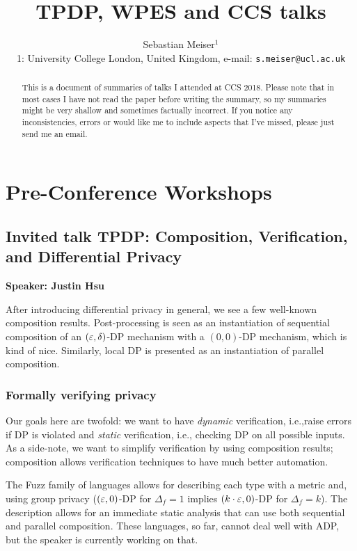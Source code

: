 \documentclass{article}
\title{TPDP, WPES and CCS talks}
\author{Sebastian Meiser$^1$
\\%
 1: University College London, United Kingdom, e-mail: \texttt{s.meiser@ucl.ac.uk}\\%
}
\begin{document}
\maketitle

\begin{abstract}
This is a document of summaries of talks I attended at CCS 2018. Please note that in most cases I have not read the paper before writing the summary, so my summaries might be very shallow and sometimes factually incorrect. If you notice any inconsistencies, errors or would like me to include aspects that I've missed, please just send me an email.
\end{abstract}

\tableofcontents
\clearpage

\section{Pre-Conference Workshops}

\subsection{Invited talk TPDP: Composition, Verification, and Differential Privacy}
\noindent\textbf{Speaker: Justin Hsu}

After introducing differential privacy in general, we see a few well-known composition results.
Post-processing is seen as an instantiation of sequential composition of an $(\varepsilon,\delta)$-DP mechanism with a $(0,0)$-DP mechanism, which is kind of nice. Similarly, local DP is presented as an instantiation of parallel composition.

\subsubsection{Formally verifying privacy}
Our goals here are twofold: we want to have \emph{dynamic} verification, i.e.,raise errors if DP is violated and \emph{static} verification, i.e., checking DP on all possible inputs.
As a side-note, we want to simplify verification by using composition results; composition allows verification techniques to have much better automation.


The Fuzz family of languages allows for describing each type with a metric and, using group privacy ($(\varepsilon,0)$-DP for $\Delta_f = 1$ implies $(k\cdot \varepsilon,0)$-DP for $\Delta_f = k$). The description allows for an immediate static analysis that can use both sequential and parallel composition. These languages, so far, cannot deal well with ADP, but the speaker is currently working on that.
\end{document}
